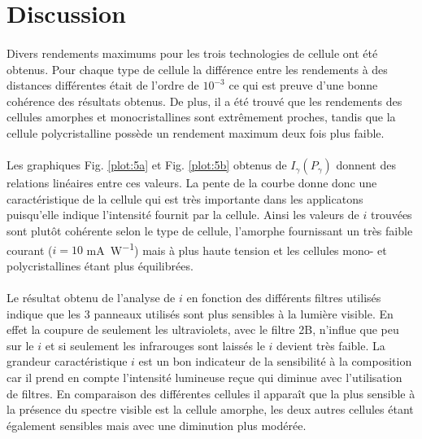 \section{Discussion}



\paragraph{}
Divers rendements maximums pour les trois technologies de cellule ont été obtenus. Pour chaque type de cellule la différence entre les rendements à des distances différentes était de l'ordre de \(10^{-3}\) ce qui est preuve d'une bonne cohérence des résultats obtenus. De plus, il a été trouvé que les rendements des cellules amorphes et monocristallines sont extrêmement proches, tandis que la cellule polycristalline possède un rendement maximum deux fois plus faible.

\paragraph{}
Les graphiques Fig. \ref{plot:5a} et Fig. \ref{plot:5b} obtenus de \(I_\gamma (P_\gamma)\) donnent des relations linéaires entre ces valeurs. La pente de la courbe donne donc une caractéristique de la cellule qui est très importante dans les applicatons puisqu'elle indique l'intensité fournit par la cellule. Ainsi les valeurs de \(i\) trouvées sont plutôt cohérente selon le type de cellule, l'amorphe fournissant un très faible courant (\(i = 10\) \unit{\milli \ampere \per \watt}) mais à plus haute tension et les cellules mono- et polycristallines étant plus équilibrées.

\paragraph{}
Le résultat obtenu de l'analyse de \(i\) en fonction des différents filtres utilisés indique que les 3 panneaux utilisés sont plus sensibles à la lumière visible. En effet la coupure de seulement les ultraviolets, avec le filtre 2B, n'influe que peu sur le \(i\) et si seulement les infrarouges sont laissés le \(i\) devient très faible. La grandeur caractéristique \(i\) est un bon indicateur de la sensibilité à la composition car il prend en compte l'intensité lumineuse reçue qui diminue avec l'utilisation de filtres. En comparaison des différentes cellules il apparaît que la plus sensible à la présence du spectre visible est la cellule amorphe, les deux autres cellules étant également sensibles mais avec une diminution plus modérée.


